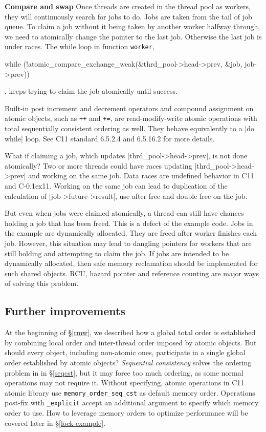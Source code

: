 \documentclass[fontsize=10pt, oneside]{scrartcl}
\newcommand{\monobox}[1]{\mbox{\texttt{#1}}}
\newcommand{\cplusplus}[1]{C\kern-0.1ex\raisebox{0.15ex}{\texttt{++}}}
\newcommand{\clang}[1]{C}
\newcommand{\introduce}[1]{\textit{#1}}
\newcommand{\secref}[1]{\hyperref[#1]{\textsc{\S}\ref*{#1}}}
\begin{document}
\textbf{Compare and swap}
Once threads are created in the thread pool as workers, they will continuously search for jobs to do.
Jobs are taken from the tail of job queue.
To claim a job without it being taken by another worker halfway through, we need to atomically change the pointer to the last job. Otherwise the last job is under races.
The while loop in function \monobox{worker},
\begin{ccode}
while (!atomic_compare_exchange_weak(&thrd_pool->head->prev, &job,
                                       job->prev)) {
}
\end{ccode}
, keeps trying to claim the job atomically until success.

Built-in post increment and decrement operators and compound assignment on atomic objects, such as \monobox{++} and \monobox{+=}, are read-modify-write atomic operations with total sequentially consistent ordering as well. 
They behave equivalently to a \cc|do while| loop. See \clang{}11 standard 6.5.2.4 and 6.5.16.2 for more details.

What if claiming a job, which updates \cc|thrd_pool->head->prev|, is not done atomically?
Two or more threads could have races updating \cc|thrd_pool->head->prev| and working on the same job.
Data races are undefined behavior in \clang{}11 and \cplusplus{}11.
Working on the same job can lead to duplication of the calculation of \cc|job->future->result|, 
use after free and double free on the job.

But even when jobs were claimed atomically, a thread can still have chances holding a job that has been freed.
This is a defect of the example code.
Jobs in the example are dynamically allocated. They are freed after worker finishes each job. 
However, this situation may lead to dangling pointers for workers that are still holding and attempting to claim the job. 
If jobs are intended to be dynamically allocated, then safe memory reclamation should be implemented for such shared objects.
RCU, hazard pointer and reference counting are major ways of solving this problem.

\subsection{Further improvements}
At the beginning of \secref{rmw}, we described how a global total order is established by combining local order and inter-thread order imposed by atomic objects. 
But should every object, including non-atomic ones, participate in a single global order established by atomic objects?
\introduce{Sequential consistency} solves the ordering problem in in \secref{seqcst}, but it may force too much ordering, as some normal operations may not require it.
Without specifying, atomic operations in \clang{}11 atomic library use \monobox{memory\_order\_seq\_cst} as default memory order. Operations post-fix with \monobox{\_explicit} accept an additional argument to specify which memory order to use.
How to leverage memory orders to optimize performance will be covered later in \secref{lock-example}.
\end{document}
